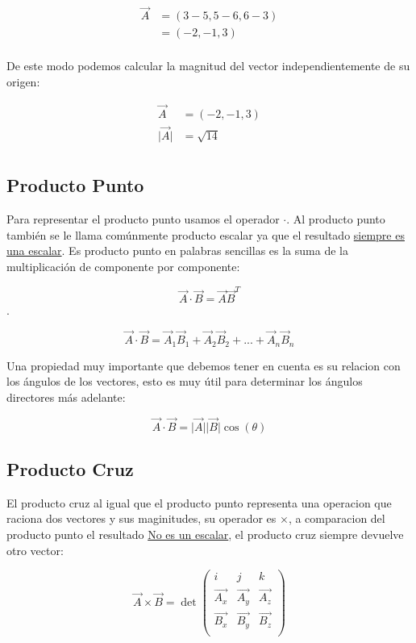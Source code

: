 \documentclass{article}
\begin{document}
\[ \begin{aligned}
\vec{A} &= (3-5,5-6,6-3) \\
~ &= (-2,-1,3) \\
\end{aligned} \]

De este modo podemos calcular la magnitud del vector independientemente de su origen:

\[ \begin{aligned}
\vec{A} &= (-2,-1,3) \\
\vert\vec{A}\vert &= \sqrt{14} \\
\end{aligned} \]

\subsection{Producto Punto}
\label{sec:orgfd4cfa1}
Para representar el producto punto usamos el operador \(\cdot\). Al producto punto también se le llama comúnmente producto escalar ya que el resultado \uline{siempre es una escalar}. Es producto punto en palabras sencillas es la suma de la multiplicación de componente por componente:

\[\vec{A} \cdot \vec{B} = \vec{A}\vec{B}^T\].

\[
\vec{A} \cdot \vec{B} = \vec{A}_1 \vec{B}_1 + \vec{A}_2 \vec{B}_2 + ... + \vec{A}_n \vec{B}_n
\]

Una propiedad muy importante que debemos tener en cuenta es su relacion con los ángulos de los vectores, esto es muy útil para determinar los ángulos directores más adelante:

\[
 \vec{A}\cdot\vec{B} = \vert\vec{A}\vert\vert\vec{B}\vert \cos(\theta)
\]

\subsection{Producto Cruz}
\label{sec:orgf02ea17}
El producto cruz al igual que el producto punto representa una operacion que raciona dos vectores y sus maginitudes, su operador es \(\times\), a comparacion del producto punto el resultado \uline{No es un escalar}, el producto cruz siempre devuelve otro vector:

\[
\vec{A} \times \vec{B} = \det\begin{pmatrix}
       i    &      j    &     k    \\
  \vec{A_x} & \vec{A_y} & \vec{A_z}\\
  \vec{B_x} & \vec{B_y} & \vec{B_z}\\
\end{pmatrix}
\]
\end{document}
